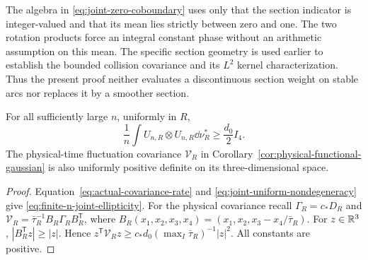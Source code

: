 \begin{remark}
The algebra in \eqref{eq:joint-zero-coboundary} uses only that the
section indicator is integer-valued and that its mean lies strictly
between zero and one. The two rotation products force an integral
constant phase without an arithmetic assumption on this mean. The
specific section geometry is used earlier to establish the bounded
collision covariance and its $L^2$ kernel characterization. Thus the
present proof neither evaluates a discontinuous section weight on
stable arcs nor replaces it by a smoother section.
\end{remark}

\begin{corollary}
\label{cor:actual-uniform-ellipticity}
For all sufficiently large $n$, uniformly in $R$,
\begin{equation}\label{eq:finite-n-joint-ellipticity}
 \frac1n\int U_{n,R}\otimes U_{n,R}\dd\nu_R^*
       \ge\frac{d_0}{2}I_4.
\end{equation}
The physical-time fluctuation covariance $\mathcal V_R$ in
Corollary~\ref{cor:physical-functional-gaussian} is also uniformly
positive definite on its three-dimensional space.
\end{corollary}
\begin{proof}
Equation~\eqref{eq:actual-covariance-rate} and
\eqref{eq:joint-uniform-nondegeneracy} give
\eqref{eq:finite-n-joint-ellipticity}. For the physical covariance recall
$\Gamma_R=c_*D_R$ and
$\mathcal V_R=\bar\tau_R^{-1}B_R\Gamma_RB_R^{\mathsf T}$, where
$B_R(x_1,x_2,x_3,x_4)=(x_1,x_2,x_3-x_4/\bar\tau_R)$.
For $z\in\mathbb R^3$, $|B_R^{\mathsf T}z|\ge|z|$. Hence
$z^{\mathsf T}\mathcal V_Rz\ge
 c_*d_0(\max_I\bar\tau_R)^{-1}|z|^2$. All constants are positive.
\end{proof}

